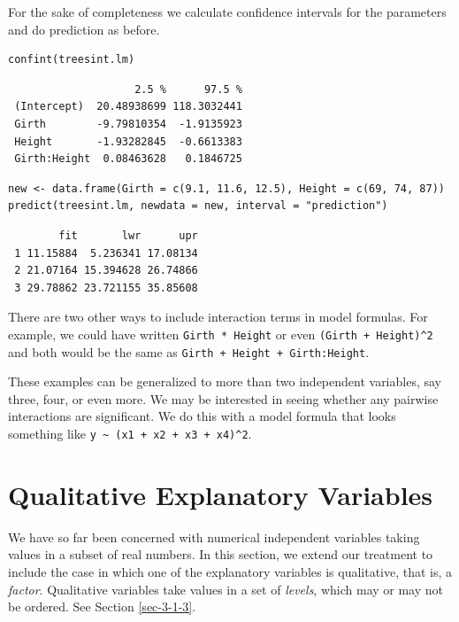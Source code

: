 \documentclass[captions=tableheading]{scrbook}
\begin{document}
For the sake of completeness we calculate confidence intervals for the parameters and do prediction as before.


\begin{verbatim}
confint(treesint.lm)
\end{verbatim}

\begin{verbatim}
                    2.5 %      97.5 %
 (Intercept)  20.48938699 118.3032441
 Girth        -9.79810354  -1.9135923
 Height       -1.93282845  -0.6613383
 Girth:Height  0.08463628   0.1846725
\end{verbatim}


\begin{verbatim}
new <- data.frame(Girth = c(9.1, 11.6, 12.5), Height = c(69, 74, 87))
predict(treesint.lm, newdata = new, interval = "prediction")
\end{verbatim}

\begin{verbatim}
        fit       lwr      upr
 1 11.15884  5.236341 17.08134
 2 21.07164 15.394628 26.74866
 3 29.78862 23.721155 35.85608
\end{verbatim}

\begin{rem}
There are two other ways to include interaction terms in model formulas. For example, we could have written \texttt{Girth * Height} or even \texttt{(Girth + Height)\textasciicircum{}2} and both would be the same as \texttt{Girth + Height + Girth:Height}. 
\end{rem}

These examples can be generalized to more than two independent variables, say three, four, or even more. We may be interested in seeing whether any pairwise interactions are significant. We do this with a model formula that looks something like \texttt{y \textasciitilde{} (x1 + x2 + x3 + x4)\textasciicircum{}2}.  
\section{Qualitative Explanatory Variables}
\label{sec-12-6}
\label{sec-Qualitative-Explanatory-Variables}


We have so far been concerned with numerical independent variables taking values in a subset of real numbers. In this section, we extend our treatment to include the case in which one of the explanatory variables is qualitative, that is, a \emph{factor}. Qualitative variables take values in a set of \emph{levels}, which may or may not be ordered. See Section \ref{sec-3-1-3}.
\end{document}
